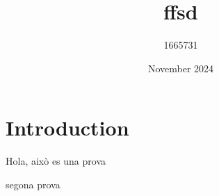 \documentclass{article}
\title{ffsd}
\author{1665731 }
\date{November 2024}
\begin{document}
\maketitle

\section{Introduction}

Hola, això es una prova

segona prova
\end{document}
